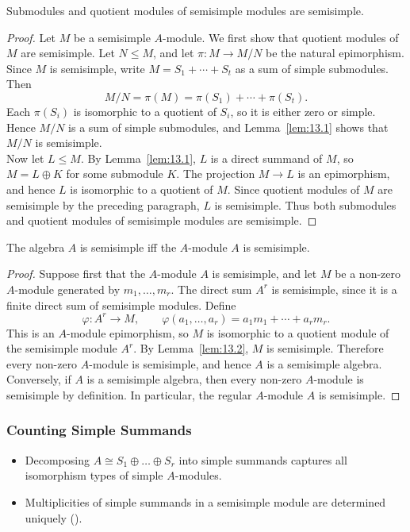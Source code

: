 \documentclass[../Odyssey_Project.tex]{subfiles}
\begin{document}
\begin{lemma}
\label{lem:13.2}
Submodules and quotient modules of semisimple modules are semisimple.
\end{lemma}
\begin{proof}
    Let $M$ be a semisimple $A$-module. We first show that quotient modules of $M$ are semisimple. Let $N \leq M$, and let $\pi \colon M \to M/N$ be the natural epimorphism. Since $M$ is semisimple, write $M = S_1 + \cdots + S_t$ as a sum of simple submodules. Then
    \[
        M/N = \pi(M) = \pi(S_1) + \cdots + \pi(S_t).
    \]
    Each $\pi(S_i)$ is isomorphic to a quotient of $S_i$, so it is either zero or simple. Hence $M/N$ is a sum of simple submodules, and Lemma~\ref{lem:13.1} shows that $M/N$ is semisimple.\\
    Now let $L \leq M$. By Lemma~\ref{lem:13.1}, $L$ is a direct summand of $M$, so $M = L \oplus K$ for some submodule $K$. The projection $M \to L$ is an epimorphism, and hence $L$ is isomorphic to a quotient of $M$. Since quotient modules of $M$ are semisimple by the preceding paragraph, $L$ is semisimple. Thus both submodules and quotient modules of semisimple modules are semisimple.
\end{proof}

\begin{lemma}
\label{lem:13.3}
The algebra $A$ is semisimple iff the $A$-module $A$ is semisimple.
\end{lemma}
\begin{proof}
    Suppose first that the $A$-module $A$ is semisimple, and let $M$ be a non-zero $A$-module generated by $m_1,\ldots,m_r$. The direct sum $A^r$ is semisimple, since it is a finite direct sum of semisimple modules. Define
    \[
        \varphi \colon A^r \to M, \qquad \varphi(a_1,\ldots,a_r) = a_1m_1 + \cdots + a_rm_r.
    \]
    This is an $A$-module epimorphism, so $M$ is isomorphic to a quotient module of the semisimple module $A^r$. By Lemma~\ref{lem:13.2}, $M$ is semisimple. Therefore every non-zero $A$-module is semisimple, and hence $A$ is a semisimple algebra.\\
    Conversely, if $A$ is a semisimple algebra, then every non-zero $A$-module is semisimple by definition. In particular, the regular $A$-module $A$ is semisimple.
\end{proof}

\subsubsection*{Counting Simple Summands}
\begin{itemize}
    \item Decomposing $A \cong S_1 \oplus \dots \oplus S_r$ into simple summands captures all isomorphism types of simple $A$-modules.
    \item Multiplicities of simple summands in a semisimple module are determined uniquely ().
\end{itemize}
\end{document}
